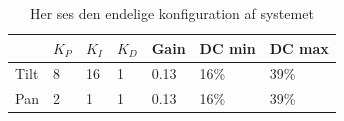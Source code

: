 \begin{table}[]
\centering
\caption{Her ses den endelige konfiguration af systemet}
\label{tab:Results}
\begin{tabular}{|l|l|l|l|l|l|l|}
\hline
     & $K_{P}$ & $K_{I}$ & $K_{D}$ & Gain & DC min & DC max \\ \hline
Tilt & 8  & 16 & 1  & 0.13 & 16\%   & 39\%   \\ \hline
Pan  & 2  & 1  & 1  & 0.13 & 16\%   & 39\%   \\ \hline
\end{tabular}
\end{table}